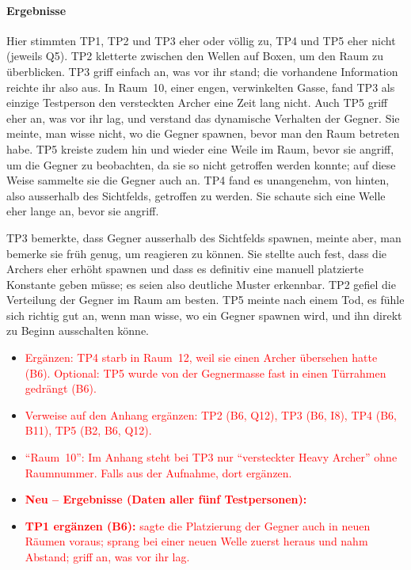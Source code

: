 \documentclass[../Main.tex]{subfiles}
\begin{document}
\paragraph{Ergebnisse}
Hier stimmten TP1, TP2 und TP3 eher oder völlig zu, TP4 und TP5 eher nicht (jeweils Q5). TP2 kletterte zwischen den Wellen auf Boxen, um den Raum zu überblicken. TP3 griff einfach an, was vor ihr stand; die vorhandene Information reichte ihr also aus. In Raum~10, einer engen, verwinkelten Gasse, fand TP3 als einzige Testperson den versteckten Archer eine Zeit lang nicht. Auch TP5 griff eher an, was vor ihr lag, und verstand das dynamische Verhalten der Gegner. Sie meinte, man wisse nicht, wo die Gegner spawnen, bevor man den Raum betreten habe. TP5 kreiste zudem hin und wieder eine Weile im Raum, bevor sie angriff, um die Gegner zu beobachten, da sie so nicht getroffen werden konnte; auf diese Weise sammelte sie die Gegner auch an. TP4 fand es unangenehm, von hinten, also ausserhalb des Sichtfelds, getroffen zu werden. Sie schaute sich eine Welle eher lange an, bevor sie angriff.

TP3 bemerkte, dass Gegner ausserhalb des Sichtfelds spawnen, meinte aber, man bemerke sie früh genug, um reagieren zu können. Sie stellte auch fest, dass die Archers eher erhöht spawnen und dass es definitiv eine manuell platzierte Konstante geben müsse; es seien also deutliche Muster erkennbar. TP2 gefiel die Verteilung der Gegner im Raum am besten. TP5 meinte nach einem Tod, es fühle sich richtig gut an, wenn man wisse, wo ein Gegner spawnen wird, und ihn direkt zu Beginn ausschalten könne.

\begin{itemize}[leftmargin=1.5cm]
    \item \textcolor{red}{Ergänzen: TP4 starb in Raum~12, weil sie einen Archer übersehen hatte (B6). Optional: TP5 wurde von der Gegnermasse fast in einen Türrahmen gedrängt (B6).}
    \item \textcolor{red}{Verweise auf den Anhang ergänzen: TP2 (B6, Q12), TP3 (B6, I8), TP4 (B6, B11), TP5 (B2, B6, Q12).}
    \item \textcolor{red}{\enquote{Raum~10}: Im Anhang steht bei TP3 nur \enquote{versteckter Heavy Archer} ohne Raumnummer. Falls aus der Aufnahme, dort ergänzen.}
\end{itemize}

\begin{itemize}[leftmargin=1.5cm]
    \item \textcolor{red}{\textbf{Neu -- Ergebnisse (Daten aller fünf Testpersonen):}}
    \item \textcolor{red}{\textbf{TP1 ergänzen (B6):} sagte die Platzierung der Gegner auch in neuen Räumen voraus; sprang bei einer neuen Welle zuerst heraus und nahm Abstand; griff an, was vor ihr lag.}
\end{itemize}
\end{document}
